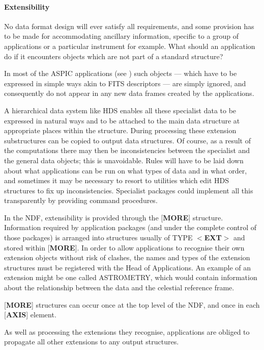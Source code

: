 \paragraph{Extensibility}
No data format design will ever satisfy all requirements, and
some provision has to be made for accommodating ancillary
information, specific to a group of applications or a
particular instrument for example.  What should an application
do if it encounters objects which are not part of a
standard structure?

In most of the {\small ASPIC} applications (see ) such objects ---
which have to be expressed in simple ways akin to {\small FITS}
descriptors ---
are simply ignored, and consequently do not appear in any new data
frames created by the applications.

A hierarchical data system like HDS enables all these specialist data
to be expressed in natural ways and to be attached
to the main data structure at appropriate places within the structure.
During
processing these extension substructures can be copied to
output data structures.
Of course, as a result of the computations there may
then be inconsistencies
between the specialist and the general data objects;  this is
unavoidable.  Rules will have to be laid down about what applications
can be run on what types of data and in what order, and sometimes
it may be necessary to resort to
utilities which edit HDS structures to fix up inconsistencies.
Specialist packages could implement all this transparently by
providing command procedures.

In the NDF, extensibility is provided through the [{\bf MORE}{]}
structure.  Information required by application packages (and
under the complete control of those packages) is arranged
into structures usually of TYPE $<${\bf EXT}$>$ and stored within
[{\bf MORE}{]}.
In order to allow
applications to recognise their own extension objects
without risk of clashes, the
names and types of the extension structures
must be registered with the Head of Applications.  An
example of an extension might be one called ASTROMETRY, which
would contain information about the relationship between
the data and the celestial reference frame.

[{\bf MORE}{]} structures can occur once
at the top level of the NDF, and
once in each [{\bf AXIS}{]} element.

As well as processing the extensions they recognise, applications
are obliged to propagate all other extensions to any output
structures.

